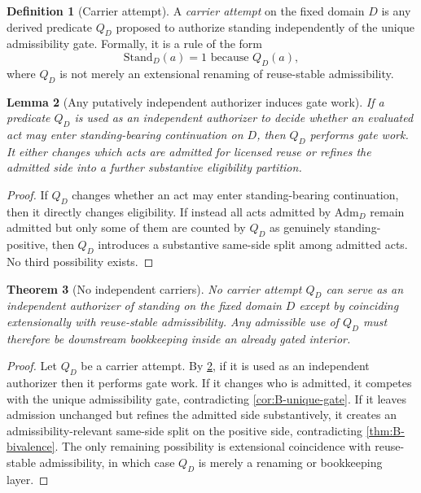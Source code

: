 \documentclass[11pt]{article}
\theoremstyle{plain}
\newtheorem{theorem}{Theorem}[section]
\newtheorem{lemma}[theorem]{Lemma}
\theoremstyle{definition}
\newtheorem{definition}[theorem]{Definition}
\newcommand{\Adm}{\mathrm{Adm}}
\newcommand{\Stand}{\mathrm{Stand}}
\newcommand{\domain}{D}
\begin{document}
\begin{definition}[Carrier attempt]
A \emph{carrier attempt} on the fixed domain $\domain$ is any derived predicate $Q_\domain$ proposed to authorize standing independently of the unique admissibility gate. Formally, it is a rule of the form
\[
\Stand_\domain(a)=1 \text{ because } Q_\domain(a),
\]
where $Q_\domain$ is not merely an extensional renaming of reuse-stable admissibility.
\end{definition}

\begin{lemma}[Any putatively independent authorizer induces gate work]
\label{lem:B-gatework}
If a predicate $Q_\domain$ is used as an independent authorizer to decide whether an evaluated act may enter standing-bearing continuation on $\domain$, then $Q_\domain$ performs gate work. It either changes which acts are admitted for licensed reuse or refines the admitted side into a further substantive eligibility partition.
\end{lemma}

\begin{proof}
If $Q_\domain$ changes whether an act may enter standing-bearing continuation, then it directly changes eligibility. If instead all acts admitted by $\Adm_\domain$ remain admitted but only some of them are counted by $Q_\domain$ as genuinely standing-positive, then $Q_\domain$ introduces a substantive same-side split among admitted acts. No third possibility exists.
\end{proof}

\begin{theorem}[No independent carriers]
\label{thm:B-no-carriers}
No carrier attempt $Q_\domain$ can serve as an independent authorizer of standing on the fixed domain $\domain$ except by coinciding extensionally with reuse-stable admissibility. Any admissible use of $Q_\domain$ must therefore be downstream bookkeeping inside an already gated interior.
\end{theorem}

\begin{proof}
Let $Q_\domain$ be a carrier attempt. By \cref{lem:B-gatework}, if it is used as an independent authorizer then it performs gate work. If it changes who is admitted, it competes with the unique admissibility gate, contradicting \cref{cor:B-unique-gate}. If it leaves admission unchanged but refines the admitted side substantively, it creates an admissibility-relevant same-side split on the positive side, contradicting \cref{thm:B-bivalence}. The only remaining possibility is extensional coincidence with reuse-stable admissibility, in which case $Q_\domain$ is merely a renaming or bookkeeping layer.
\end{proof}
\end{document}
